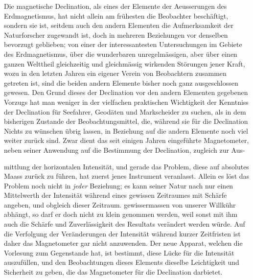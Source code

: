 Die magnetische Declination, als eines der Elemente der Aeusserungen des Erdmagnetismus, hat nicht allein am frühesten die Beobachter beschäftigt, sondern sie ist, seitdem auch den andern Elementen die Aufmerksamkeit der Naturforscher zugewandt ist, doch in mehreren Beziehungen vor denselben bevorzugt geblieben; von einer der interessantesten Untersuchungen im Gebiete des Erdmagnetismus, über die wunderbaren unregelmässigen, aber über einen ganzen Welttheil gleichzeitig und gleichmässig wirkenden Störungen jener Kraft, wozu in den letzten Jahren ein eigener Verein von Beobachtern zusammen getreten ist, sind die beiden andern Elemente bisher noch ganz ausgeschlossen gewesen. Den Grund dieses der Declination vor den andern Elementen gegebenen Vorzugs hat man weniger in der vielfachen praktischen Wichtigkeit der Kenntniss der Declination für Seefahrer, Geodäten und Markscheider zu suchen, als in dem bisherigen Zustande der Beobachtungsmittel, die, während sie für die Declination Nichts zu wünschen übrig lassen, in Beziehung auf die andern Elemente noch viel weiter zurück sind. Zwar dient das seit einigen Jahren eingeführte Magnetometer, neben seiner Anwendung auf die Bestimmung der Declination, zugleich zur Aus-\par\clearpage
{}
\noindent mittlung der horizontalen Intensität, und gerade das Problem, diese auf absolutes Maass zurück zu führen, hat zuerst jenes Instrument veranlasst. Allein es löst das Problem noch nicht in \textit{jeder} Beziehung; es kann seiner Natur nach nur einen Mittelwerth der Intensität während eines gewissen Zeitraumes mit Schärfe angeben, und obgleich dieser Zeitraum. gewissermassen von unserer Willkühr abhängt, so darf er doch nicht zu klein genommen werden, weil sonst mit ihm auch die Schärfe und Zuverlässigkeit des Resultats verändert werden würde. Auf die Verfolgung der Veränderungen der Intensität während kurzer Zeitfristen ist daher das Magnetometer gar nicht anzuwenden. Der neue Apparat, welchen die Vorlesung zum Gegenstande hat, ist bestimmt, diese Lücke für die Intensität auszufüllen, und den Beobachtungen dieses Elements dieselbe Leichtigkeit und Sicherheit zu geben, die das Magnetometer für die Declination darbietet.

